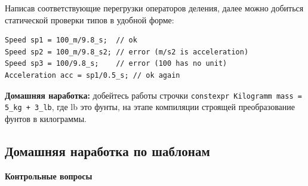 \documentclass[a4paper,12pt,oneside]{article}
\begin{document}
Написав соответствующие перегрузки операторов деления, далее можно добиться статической проверки типов в удобной форме:

\begin{lstlisting}
Speed sp1 = 100_m/9.8_s;  // ok
Speed sp2 = 100_m/9.8_s2; // error (m/s2 is acceleration)
Speed sp3 = 100/9.8_s;    // error (100 has no unit)
Acceleration acc = sp1/0.5_s; // ok again
\end{lstlisting}

\textbf{Домашняя наработка:} добейтесь работы строчки \lstinline!constexpr Kilogramm mass = 5_kg + 3_lb!, где lb это фунты, на этапе компиляции строящей преобразование фунтов в килограммы.

\pagebreak
\subsection{Домашняя наработка по шаблонам}

\textbf{Контрольные вопросы}
\end{document}
